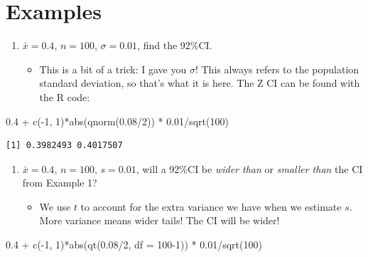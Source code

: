 \documentclass[
  letterpaper,
  DIV=11,
  numbers=noendperiod,
  oneside]{scrreprt}
\newenvironment{Shaded}{\begin{snugshade}}{\end{snugshade}}
\newcommand{\AttributeTok}[1]{\textcolor[rgb]{0.40,0.45,0.13}{#1}}
\newcommand{\DecValTok}[1]{\textcolor[rgb]{0.68,0.00,0.00}{#1}}
\newcommand{\FloatTok}[1]{\textcolor[rgb]{0.68,0.00,0.00}{#1}}
\newcommand{\FunctionTok}[1]{\textcolor[rgb]{0.28,0.35,0.67}{#1}}
\newcommand{\NormalTok}[1]{\textcolor[rgb]{0.00,0.23,0.31}{#1}}
\newcommand{\SpecialCharTok}[1]{\textcolor[rgb]{0.37,0.37,0.37}{#1}}
\providecommand{\tightlist}{%
  \setlength{\itemsep}{0pt}\setlength{\parskip}{0pt}}\usepackage{longtable,booktabs,array}
\begin{document}
\hypertarget{examples-5}{%
\section{Examples}\label{examples-5}}

\begin{enumerate}
\def\labelenumi{\arabic{enumi}.}
\tightlist
\item
  \(\bar x = 0.4\), \(n = 100\), \(\sigma = 0.01\), find the 92\%CI.

  \begin{itemize}
  \tightlist
  \item
    This is a bit of a trick: I gave you \(\sigma\)! This always refers
    to the population standard deviation, so that's what it is here. The
    Z CI can be found with the R code:
  \end{itemize}
\end{enumerate}

\begin{Shaded}
\begin{Highlighting}[]
\FloatTok{0.4} \SpecialCharTok{+} \FunctionTok{c}\NormalTok{(}\SpecialCharTok{{-}}\DecValTok{1}\NormalTok{, }\DecValTok{1}\NormalTok{)}\SpecialCharTok{*}\FunctionTok{abs}\NormalTok{(}\FunctionTok{qnorm}\NormalTok{(}\FloatTok{0.08}\SpecialCharTok{/}\DecValTok{2}\NormalTok{)) }\SpecialCharTok{*} \FloatTok{0.01}\SpecialCharTok{/}\FunctionTok{sqrt}\NormalTok{(}\DecValTok{100}\NormalTok{)}
\end{Highlighting}
\end{Shaded}

\begin{verbatim}
[1] 0.3982493 0.4017507
\end{verbatim}

\begin{enumerate}
\def\labelenumi{\arabic{enumi}.}
\setcounter{enumi}{1}
\tightlist
\item
  \(\bar x = 0.4\), \(n = 100\), \(s = 0.01\), will a 92\%CI be
  \emph{wider than} or \emph{smaller than} the CI from Example 1?

  \begin{itemize}
  \tightlist
  \item
    We use \(t\) to account for the extra variance we have when we
    estimate \(s\). More variance means wider tails! The CI will be
    wider!
  \end{itemize}
\end{enumerate}

\begin{Shaded}
\begin{Highlighting}[]
\FloatTok{0.4} \SpecialCharTok{+} \FunctionTok{c}\NormalTok{(}\SpecialCharTok{{-}}\DecValTok{1}\NormalTok{, }\DecValTok{1}\NormalTok{)}\SpecialCharTok{*}\FunctionTok{abs}\NormalTok{(}\FunctionTok{qt}\NormalTok{(}\FloatTok{0.08}\SpecialCharTok{/}\DecValTok{2}\NormalTok{, }\AttributeTok{df =} \DecValTok{100{-}1}\NormalTok{)) }\SpecialCharTok{*} \FloatTok{0.01}\SpecialCharTok{/}\FunctionTok{sqrt}\NormalTok{(}\DecValTok{100}\NormalTok{)}
\end{Highlighting}
\end{Shaded}
\end{document}
